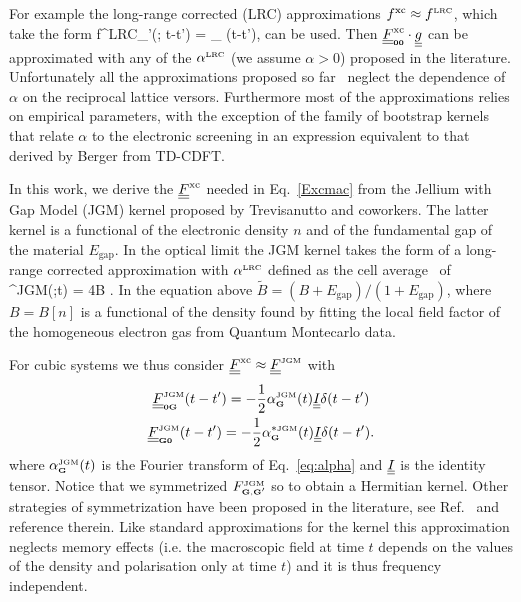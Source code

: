 For example the long-range corrected (LRC) approximations $f^{\text{xc}}\approx f^{\scriptscriptstyle\rm LRC}$, which take the form
\be
f^{\sss LRC}_{\sss \GG\GG'}(\qq{}; t-t') =
  \lim_{\qq{}} \delta(t-t'),   
\label{jgmqzero}
\ee
can be used. Then $\underline{\underline{F}}^{\text{xc}}_{\scriptscriptstyle\rm {\bf 0}{\bf 0}} \cdot \underline{\underline{g}}$ can be approximated with any of the $\alpha^{\scriptscriptstyle\rm LRC}$ (we assume $\alpha > 0$) proposed in the literature. Unfortunately all the approximations proposed so far~\cite{LRC,PhysRevB.72.125203} neglect the dependence of $\alpha$ on the reciprocal lattice versors. Furthermore most of the approximations relies on empirical parameters, with the exception of the family of bootstrap kernels~\cite{PhysRevLett.114.146402,PhysRevLett.107.186401} that relate $\alpha$ to the electronic screening in an expression equivalent to that derived by Berger from TD-CDFT.

In this work, we derive the $\underline{\underline{F}}^{\text{xc}}$ needed in Eq.~\eqref{Excmac} from the Jellium with Gap Model (JGM) kernel proposed by Trevisanutto and coworkers.\cite{jgm}
The latter kernel is a functional of the electronic density $n$ and of the fundamental gap of the material $E_{\text{gap}}$. In the optical limit the JGM kernel takes the form of a long-range corrected approximation
with $\alpha^{\scriptscriptstyle\rm LRC}$ defined as the cell average~\cite{jgm} of
\be
\alpha^{\sss JGM}(\rr;t) = 4\pi \tilde B .  
\label{eq:alpha}
\ee
In the equation above $\tilde B = (B + E_{\text{gap}})/(1 + E_{\text{gap}})$, where $B=B[n]$ is a functional of the density found by fitting the local field factor of the homogeneous electron gas from Quantum Montecarlo data.~\cite{PhysRevB.57.14569}   
 
For cubic systems we thus consider $\underline{\underline{F}}^{\text{xc}}\approx\underline{\underline{F}}^{\scriptscriptstyle\rm JGM}$ with
\begin{subequations}
\begin{gather}
\underline{\underline{F}}^{\scriptscriptstyle\rm JGM}_{\scriptscriptstyle\rm {\bf 0}{\bf G}}(t-t') = -\frac{1}{2}\alpha^{\scriptscriptstyle\rm JGM}_{\scriptscriptstyle\rm {\bf G}}(t) \underline{\underline{I}} \delta(t-t') \\
\underline{\underline{F}}^{\scriptscriptstyle\rm JGM}_{\scriptscriptstyle\rm {\bf G}{\bf 0}}(t-t') = -\frac{1}{2}\alpha^{*\scriptscriptstyle\rm JGM}_{\scriptscriptstyle\rm {\bf G}}(t) \underline{\underline{I}} \delta(t-t').
\end{gather}
\label{eq:krnl}
\end{subequations}
where $\alpha^{\scriptscriptstyle\rm JGM}_{\scriptscriptstyle\rm {\bf G}}(t)$ is the Fourier transform of Eq.~\eqref{eq:alpha} and $\underline{\underline{I}}$ is the identity tensor. 
Notice that we symmetrized ${F}^{\scriptscriptstyle\rm JGM}_{\scriptscriptstyle\rm {\bf G},{\bf G}'}$ so to obtain a Hermitian kernel. Other strategies of symmetrization have been proposed in the literature, see Ref.~\cite{jgm} and reference therein.
Like standard approximations for the kernel this approximation neglects memory effects (i.e. the macroscopic field at time $t$ depends on the values of the density and polarisation only at time $t$) and it is thus frequency independent.

